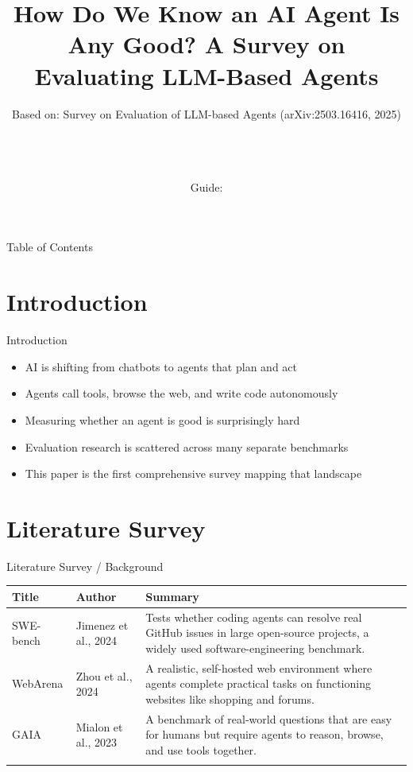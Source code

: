 \documentclass[10pt]{beamer}
\title[B.Tech Seminar]{How Do We Know an AI Agent Is Any Good? A Survey on Evaluating LLM-Based Agents}
\subtitle{Based on: Survey on Evaluation of LLM-based Agents (arXiv:2503.16416, 2025)}
\author[\studentname\ (\shortinst)]{\studentname \\ \small \rollno \\ \small \rollclass \\ \small Guide: \guidename}
\institute[]{\deptname \\ \collegename}
\date{\seminardate}
\begin{document}
\begin{frame}[plain]
  \titlepage
\end{frame}

\begin{frame}{Table of Contents}
  \tableofcontents
\end{frame}

\section{Introduction}
\begin{frame}{Introduction}
\begin{itemize}
  \item AI is shifting from chatbots to agents that plan and act
  \item Agents call tools, browse the web, and write code autonomously
  \item Measuring whether an agent is good is surprisingly hard
  \item Evaluation research is scattered across many separate benchmarks
  \item This paper is the first comprehensive survey mapping that landscape
\end{itemize}
\end{frame}

\section{Literature Survey}
\begin{frame}{Literature Survey / Background}
  \small
  \begin{tabular}{@{}p{2.7cm}p{2.3cm}p{5.6cm}@{}}
    \toprule
    \textbf{Title} & \textbf{Author} & \textbf{Summary} \\
    \midrule
    SWE-bench & Jimenez et al., 2024 & Tests whether coding agents can resolve real GitHub issues in large open-source projects, a widely used software-engineering benchmark. \\
    \addlinespace
    WebArena & Zhou et al., 2024 & A realistic, self-hosted web environment where agents complete practical tasks on functioning websites like shopping and forums. \\
    \addlinespace
    GAIA & Mialon et al., 2023 & A benchmark of real-world questions that are easy for humans but require agents to reason, browse, and use tools together. \\
    \addlinespace
    \bottomrule
  \end{tabular}
\end{frame}
\end{document}
